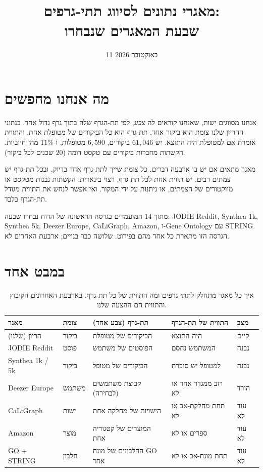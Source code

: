 \documentclass[11pt]{article}
\title{מאגרי נתונים לסיווג תתי-גרפים:\\ שבעת המאגרים שנבחרו}
\author{}
\date{11 באוקטובר 2026}
\newcommand{\en}[1]{\foreignlanguage{english}{#1}}
\begin{document}
\maketitle

\section*{מה אנחנו מחפשים}

אנחנו מסווגים ישות, שאנחנו קוראים לה \emph{צבע}, לפי תת-הגרף שלה בתוך גרף גדול אחד. בנתוני
ההריון שלנו צומת הוא ביקור אחד, תת-גרף הוא כל הביקורים של מטופלת אחת, והתווית אומרת אם
למטופלת היה התוצא. יש $61{,}046$ ביקורים, $6{,}590$ מטופלות, ו-$11\%$ מהן חיוביות. הקשתות
מחברות ביקורים עם טקסט דומה ($20$ שכנים לכל ביקור).

מאגר מתאים אם יש בו ארבעה דברים. כל צומת שייך לתת-גרף אחד בדיוק, ובכל תת-גרף יש צמתים רבים.
יש תווית אחת לכל תת-גרף, רצוי בינארית. הקשתות נבנות מטקסט או מווקטורים של הצמתים, או ניתנות
על ידי המקור. ואי אפשר לנחש את התווית מגודל תת-הגרף בלבד.

מתוך $14$ המועמדים בגרסה הראשונה של הדוח נבחרו שבעה: \en{JODIE Reddit}, \en{Synthea 1k},
\en{Synthea 5k}, \en{Deezer Europe}, \en{CaLiGraph}, \en{Amazon}, ו-\en{Gene Ontology} עם
\en{STRING}. הגרסה הזו מתארת כל אחד מהם בפירוט. שלושה כבר בנויים; ארבעת האחרים לא.

\section*{במבט אחד}

\begin{table}[H]
\centering
\small
\begin{tabularx}{\textwidth}{lXXXl}
\toprule
מאגר & צומת & תת-גרף (צבע אחד) & התווית של תת-הגרף & מצב \\
\midrule
הריון (שלנו) & ביקור & הביקורים של מטופלת & היה התוצא & קיים \\
\addlinespace
\en{JODIE Reddit} & פוסט & הפוסטים של משתמש & המשתמש נחסם & נבנה \\
\en{Synthea 1k / 5k} & ביקור & הביקורים של מטופל & למטופל יש סוכרת & נבנה \\
\en{Deezer Europe} & משתמש & קבוצת משתמשים (לבחירה) & רוב ממגדר אחד או לא & הורד \\
\en{CaLiGraph} & ישות & הישויות של מחלקה אחת & תחת מחלקת-אב או לא & עוד לא \\
\en{Amazon} & מוצר & המוצרים של קטגוריה אחת & ספרים או לא & עוד לא \\
\en{GO + STRING} & חלבון & החלבונים של מונח \en{GO} אחד & תחת מונח-אב או לא & עוד לא \\
\bottomrule
\end{tabularx}
\caption{איך כל מאגר מתחלק לתתי-גרפים ומה התווית של כל תת-גרף. בארבעת האחרונים הקיבוץ והתווית
הם ההצעה שלנו.}
\end{table}
\end{document}

